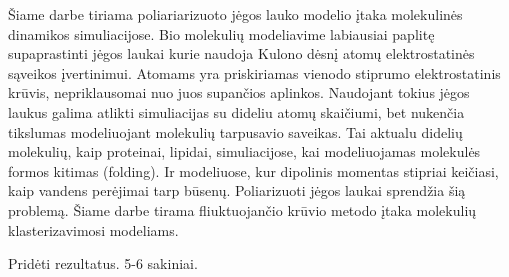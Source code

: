 Šiame darbe tiriama poliariarizuoto jėgos lauko modelio įtaka molekulinės dinamikos simuliacijose.
Bio molekulių modeliavime labiausiai paplitę supaprastinti jėgos laukai kurie naudoja Kulono dėsnį atomų elektrostatinės sąveikos įvertinimui.
Atomams yra priskiriamas vienodo stiprumo elektrostatinis krūvis, nepriklausomai nuo juos supančios aplinkos.
Naudojant tokius jėgos laukus galima atlikti simuliacijas su dideliu atomų skaičiumi, bet nukenčia tikslumas modeliuojant molekulių tarpusavio saveikas.
Tai aktualu didelių molekulių, kaip proteinai, lipidai, simuliacijose, kai modeliuojamas molekulės formos kitimas (folding).
Ir modeliuose, kur dipolinis momentas stipriai keičiasi, kaip vandens perėjimai tarp būsenų.
Poliarizuoti jėgos laukai sprendžia šią problemą.
Šiame darbe tirama fliuktuojančio krūvio metodo įtaka molekulių klasterizavimosi modeliams.


Pridėti rezultatus. 5-6 sakiniai.
